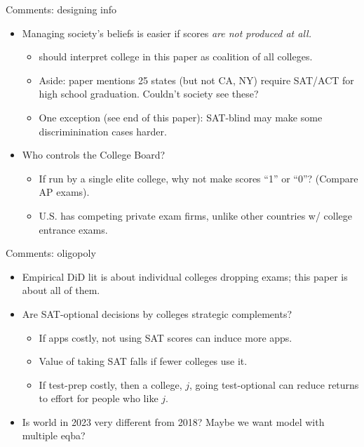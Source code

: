 \documentclass[11pt, aspectratio=169]{beamer}
\theoremstyle{plain}
\theoremstyle{plain}
\theoremstyle{plain}
\theoremstyle{plain}
\begin{document}
\begin{frame}{Comments: designing info}
    \begin{itemize}
        \item Managing society's beliefs is easier if scores \emph{are not produced at all.} \pause
        \begin{itemize}
            \item should interpret college in this paper as coalition of all colleges. \pause %
            \item Aside: paper mentions 25 states (but not CA, NY) require SAT/ACT for high school graduation.  Couldn't society see these? \pause
            \item One exception (see end of this paper): SAT-blind may make some discriminination cases harder. \pause
        \end{itemize}

        \item Who controls the College Board? \pause
        \begin{itemize}
            \item If run by a single elite college, why not make scores ``1'' or ``0''?  (Compare AP exams). \pause
            \item U.S. has competing private exam firms, unlike other countries w/ college entrance exams.
        \end{itemize}
    \end{itemize}
\end{frame}

\begin{frame}{Comments: oligopoly}
\begin{itemize}
    \item Empirical DiD lit is about individual colleges dropping exams; this paper is about all of them.
    \item Are SAT-optional decisions by colleges strategic complements?
    \begin{itemize}
        \item If apps costly, not using SAT scores can induce more apps.
        \item Value of taking SAT falls if fewer colleges use it.
        \item If test-prep costly, then a college, $j$, going test-optional can reduce returns to effort for people who like $j$.
    \end{itemize}
    \item Is world in 2023 very different from 2018? Maybe we want model with multiple eqba?
\end{itemize}
\end{frame}
\end{document}
